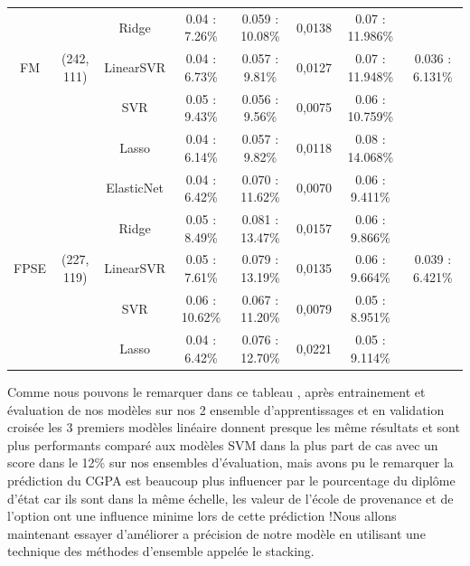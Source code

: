 \begin{table}
{{\begin{tabular}{|c|c|c|c|c|c|c|c|}
		&              &       Ridge &   0.04 : 7.26\% &  0.059  : 10.08\% &       0,0138 &  0.07 : 11.986\% &                 \\ \cline{3-8}
		FM &   (242, 111) &   LinearSVR &   0.04 : 6.73\% &   0.057  : 9.81\% &       0,0127 &  0.07 : 11.948\% &  0.036 : 6.131\% \\ \cline{3-8}
		&              &         SVR &   0.05 : 9.43\% &   0.056  : 9.56\% &       0,0075 &  0.06 : 10.759\% &                 \\ \cline{3-8}
		&              &       Lasso &   0.04 : 6.14\% &   0.057  : 9.82\% &       0,0118 &  0.08 : 14.068\% &                 \\ \cline{1-8}
		&              &  ElasticNet &   0.04 : 6.42\% &  0.070  : 11.62\% &       0,0070 &   0.06 : 9.411\% &                 \\ \cline{3-8}
		&              &       Ridge &   0.05 : 8.49\% &  0.081  : 13.47\% &       0,0157 &   0.06 : 9.866\% &                 \\ \cline{3-8}
		FPSE &   (227, 119) &   LinearSVR &   0.05 : 7.61\% &  0.079  : 13.19\% &       0,0135 &   0.06 : 9.664\% &  0.039 : 6.421\% \\ \cline{3-8}
		&              &         SVR &  0.06 : 10.62\% &  0.067  : 11.20\% &       0,0079 &   0.05 : 8.951\% &                 \\ \cline{3-8}
		&              &       Lasso &   0.04 : 6.42\% &  0.076  : 12.70\% &       0,0221 &   0.05 : 9.114\% &                 \\ \cline{1-8}
	\end{tabular}}}
	\endgroup
\end{table}
\newpage
Comme nous pouvons le remarquer dans ce tableau , après entrainement et évaluation de nos modèles sur nos 2 ensemble d'apprentissages et en validation croisée les 3 premiers modèles linéaire donnent presque les même résultats et sont plus performants comparé aux modèles \ac{SVM} dans la plus part de cas avec un score dans le 12\% sur nos ensembles d'évaluation, mais avons pu le remarquer la prédiction du \ac{CGPA} est beaucoup plus influencer par le pourcentage du diplôme d'état car ils sont dans la même échelle, les valeur de l'école de provenance et de l'option ont une influence minime lors de cette prédiction !Nous allons maintenant essayer d'améliorer a précision de notre modèle en utilisant  une technique des méthodes d'ensemble appelée le stacking.
